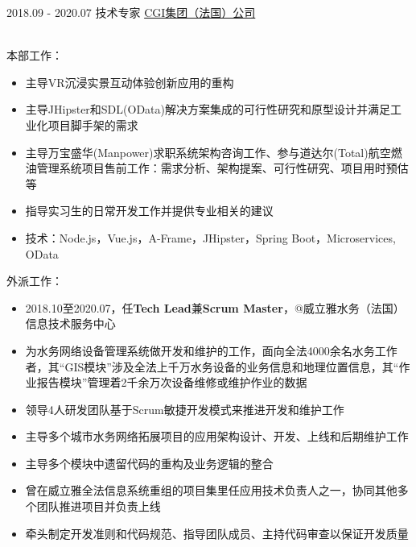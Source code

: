 \documentclass[letterpaper]{twentysecondcv} %
\begin{document}
\vspace{-0.2cm}

\begin{twentyfluid}

\twentyitemfluid
    {2018.09 - 2020.07}
    {技术专家}
    {\href{https://www.cgi.fr/fr-fr}{CGI集团（法国）公司}}
    {\\     }
    {
    {
    \\
    本部工作：
    \begin{itemize}
        \item 主导VR沉浸实景互动体验创新应用的重构
        \item 主导JHipster和SDL(OData)解决方案集成的可行性研究和原型设计并满足工业化项目脚手架的需求
        \item 主导万宝盛华(Manpower)求职系统架构咨询工作、参与道达尔(Total)航空燃油管理系统项目售前工作：需求分析、架构提案、可行性研究、项目用时预估等
        \item 指导实习生的日常开发工作并提供专业相关的建议
        \item 技术：Node.js，Vue.js，A-Frame，JHipster，Spring Boot，Microservices, OData
    \end{itemize}
    外派工作：
    \begin{itemize}
        \item 2018.10至2020.07，任\textbf{Tech Lead}兼\textbf{Scrum Master}，@威立雅水务（法国）信息技术服务中心
        \item 为水务网络设备管理系统做开发和维护的工作，面向全法4000余名水务工作者，其``GIS模块''涉及全法上千万水务设备的业务信息和地理位置信息，其``作业报告模块''管理着2千余万次设备维修或维护作业的数据
        \item 领导4人研发团队基于Scrum敏捷开发模式来推进开发和维护工作
        \item 主导多个城市水务网络拓展项目的应用架构设计、开发、上线和后期维护工作
        \item 主导多个模块中遗留代码的重构及业务逻辑的整合
        \item 曾在威立雅全法信息系统重组的项目集里任应用技术负责人之一，协同其他多个团队推进项目并负责上线
        \item 牵头制定开发准则和代码规范、指导团队成员、主持代码审查以保证开发质量

\end{itemize}}}
\end{twentyfluid}
\end{document}
